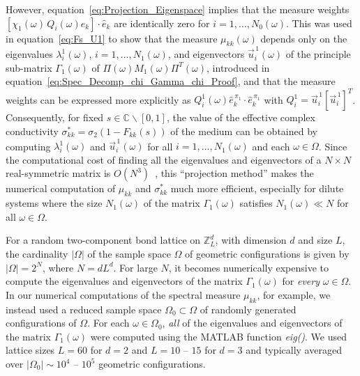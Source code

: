 \documentclass{cmslatex}
\begin{document}
However, equation~\eqref{eq:Projection_Eigenspace} implies that the
measure weights $[\chi_1(\omega)\,Q_i(\omega)\hat{e}_k]\cdot\hat{e}_k$ are 
identically zero for $i=1,\ldots,N_0(\omega)$. This was used in
equation~\eqref{eq:Fs_U1} to show that the measure $\mu_{kk}(\omega)$ depends
only on the eigenvalues $\lambda^1_i(\omega)$, $i=1,\ldots,N_1(\omega)$, and eigenvectors
$\vec{u}^{\,1}_i(\omega)$ of the principle sub-matrix $\Gamma_1(\omega)$ of
$\Pi(\omega)M_1(\omega)\Pi^T(\omega)$, introduced in 
equation~\eqref{eq:Spec_Decomp_chi_Gamma_chi_Proof}, and that the
measure weights can be expressed more explicitly as
$Q^1_i(\omega)\hat{e}_k^{\,\pi_1}\cdot\hat{e}_k^{\,\pi_1}$ with 
$Q^1_i=\vec{u}^{\,1}_i[\vec{u}^{\,1}_i]^T$.  Consequently,
for fixed $s\in\mathbb{C}\backslash[0,1]$, the value of
the effective complex conductivity $\sigma^*_{kk}=\sigma_2(1-F_{kk}(s))$ of
the medium can be obtained by computing $\lambda^1_i(\omega)$ and
$\vec{u}^{\,1}_i(\omega)$ for all $i=1,\ldots,N_1(\omega)$ and each $\omega\in\Omega$. Since the
computational cost of finding all the eigenvalues and eigenvectors of
a $N\times N$ real-symmetric matrix is $O(N^3)$~\cite{Demmel:1997}, this ``projection
method'' makes the numerical computation of $\mu_{kk}$ and $\sigma^*_{kk}$
much more efficient, especially for dilute systems where the size
$N_1(\omega)$ of the matrix $\Gamma_1(\omega)$ satisfies $N_1(\omega)\ll N$ for all $\omega\in\Omega$.   


For a random two-component bond lattice on $\mathbb{Z}^d_L$, with
dimension $d$ and size $L$, the cardinality $|\Omega|$ of the sample space
$\Omega$ of geometric configurations is 
given by $|\Omega|=2^N$, where $N=dL^d$. For large $N$, it
becomes numerically expensive to compute the eigenvalues and
eigenvectors of the matrix $\Gamma_1(\omega)$ for \emph{every} $\omega\in\Omega$. In our
numerical computations of the spectral measure $\mu_{kk}$, for example,
we instead used a reduced sample space $\Omega_0\subset\Omega$ of randomly generated
configurations of $\Omega$. For each $\omega\in\Omega_0$, \emph{all} of the eigenvalues
and eigenvectors of the matrix $\Gamma_1(\omega)$ were computed using the MATLAB
function \emph{eig()}. We used lattice sizes $L=60$ for $d=2$ and
$L=10$ -- $15$ for  
$d=3$ and typically averaged over $|\Omega_0|\sim10^4$ -- $10^5$ geometric
configurations. 
\end{document}
